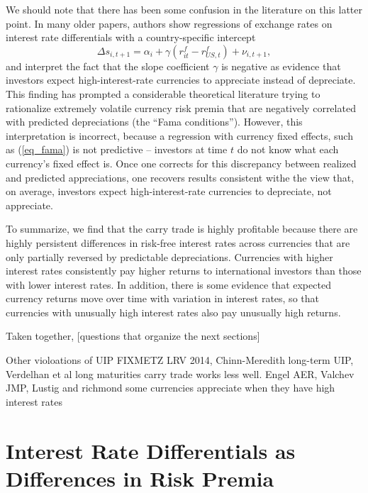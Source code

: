 \documentclass{ar-1col}
\begin{document}
We should note that there has been some confusion in the literature on
this latter point. In many older papers, authors show regressions of
exchange rates on interest rate differentials with a country-specific
intercept \begin{equation}\label{eq_fama} \Delta
  s_{i,t+1}=\alpha_i+\gamma\left( r^f_{it}-{r}^f_{US,t}\right) +\nu
  _{i,t+1},
\end{equation}
and interpret the fact that the slope coefficient $\gamma$ is negative
as evidence that investors expect high-interest-rate currencies to
appreciate instead of depreciate. This finding has prompted a
considerable theoretical literature trying to rationalize extremely
volatile currency risk premia that are negatively correlated with
predicted depreciations (the ``Fama conditions''). However, this
interpretation is incorrect, because a regression with currency fixed
effects, such as (\ref{eq_fama}) is not predictive -- investors at
time $t$ do not know what each currency's fixed effect is. Once one
corrects for this discrepancy between realized and predicted
appreciations, one recovers results consistent withe the view that, on
average, investors expect high-interest-rate currencies to depreciate,
not appreciate.

To summarize, we find that the carry trade is highly profitable
because there are highly persistent differences in risk-free interest
rates across currencies that are only partially reversed by
predictable depreciations. Currencies with higher interest rates
consistently pay higher returns to international investors than those
with lower interest rates. In addition, there is some evidence that
expected currency returns move over time with variation in interest
rates, so that currencies with unusually high interest rates also pay
unusually high returns.

Taken together, [questions that organize the next sections]

Other violoations of UIP FIXMETZ LRV 2014, Chinn-Meredith long-term
UIP, Verdelhan et al long maturities carry trade works less well.
Engel AER, Valchev JMP, Lustig and richmond some currencies appreciate
when they have high interest rates





\section{Interest Rate Differentials as Differences in Risk Premia}
\end{document}
